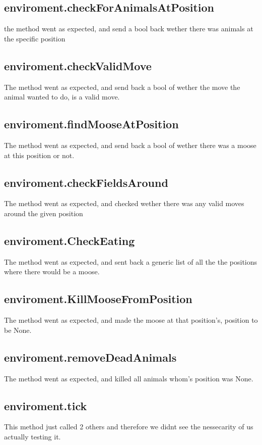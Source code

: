 \documentclass{article}
\begin{document}
    \subsection{enviroment.checkForAnimalsAtPosition}
    the method went as expected, and send a bool back wether there was animals at the specific position
    
    \subsection{enviroment.checkValidMove}
    The method went as expected, and send back a bool of wether the move the animal wanted to do, is a valid move.
    
    \subsection{enviroment.findMooseAtPosition}
    The method went as expected, and send back a bool of wether there was a moose at this position or not.
    
    \subsection{enviroment.checkFieldsAround}
    The method went as expected, and checked wether there was any valid moves around the given position
    
    \subsection{enviroment.CheckEating}
    The method went as expected, and sent back a generic list of all the the positions where there would be a moose.
    
    \subsection{enviroment.KillMooseFromPosition}
    The method went as expected, and made the moose at that position's, position to be None.
    
    \subsection{enviroment.removeDeadAnimals}
    The method went as expected, and killed all animals whom's position was None.
    
    \subsection{enviroment.tick}
    This method just called 2 others and therefore we didnt see the nessecarity of us actually testing it.
    
\end{document}
